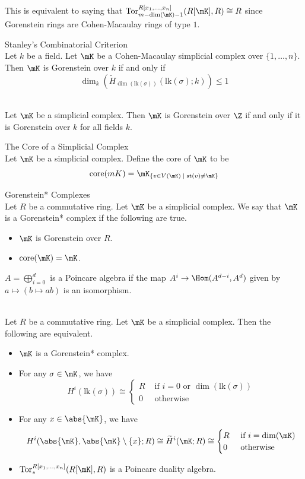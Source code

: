 \documentclass[a4paper]{article}
\begin{document}
This is equivalent to saying that $\text{Tor}_{m-\dim(\mK)-1}^{R[x_1,\dots,x_n]}(R[\mK],R)\cong R$ since Gorenstein rings are Cohen-Macaulay rings of type $1$. 

\begin{prp}{Stanley's Combinatorial Criterion}{}\\
Let $k$ be a field. Let $\mK$ be a Cohen-Macaulay simplicial complex over $\{1,\dots,n\}$. Then $\mK$ is Gorenstein over $k$ if and only if $$\dim_k(\widetilde{H}_{\dim(\text{lk}(\sigma))}(\text{lk}(\sigma);k))\leq 1$$
\end{prp}

\begin{prp}{}{}\\
Let $\mK$ be a simplicial complex. Then $\mK$ is Gorenstein over $\Z$ if and only if it is Gorenstein over $k$ for all fields $k$. 
\end{prp}

\begin{defn}{The Core of a Simplicial Complex}{}\\
Let $\mK$ be a simplicial complex. Define the core of $\mK$ to be $$\text{core}(mK)=\mK_{\{v\in V(\mK)\;|\;\text{st}(v)\neq\mK\}}$$
\end{defn}

\begin{defn}{Gorenstein* Complexes}{}\\
Let $R$ be a commutative ring. Let $\mK$ be a simplicial complex. We say that $\mK$ is a Gorenstein* complex if the following are true. 
\begin{itemize}
\item $\mK$ is Gorenstein over $R$. 
\item $\text{core}(\mK)=\mK$. 
\end{itemize}
\end{defn}

$A=\bigoplus_{i=0}^d$ is a Poincare algebra if the map $A^i\to\Hom(A^{d-i},A^d)$ given by $a\mapsto(b\mapsto ab)$ is an isomorphism. 

\begin{prp}{}{}\\
Let $R$ be a commutative ring. Let $\mK$ be a simplicial complex. Then the following are equivalent. 
\begin{itemize}
\item $\mK$ is a Gorenstein* complex. 
\item For any $\sigma\in\mK$, we have $$H^i(\text{lk}(\sigma))\cong\begin{cases}
R & \text{ if }i=0\text{ or }\dim(\text{lk}(\sigma))\\
0 & \text{ otherwise }
\end{cases}$$
\item For any $x\in\abs{\mK}$, we have $$H^i(\abs{\mK},\abs{\mK}\setminus\{x\};R)\cong\widetilde{H}^i(\mK;R)\cong\begin{cases}
R & \text{ if }i=\dim(\mK)\\
0 & \text{ otherwise }
\end{cases}$$
\item $\text{Tor}_\ast^{R[x_1,\dots,x_n]}(R[\mK],R)$ is a Poincare duality algebra. 
\end{itemize}
\end{prp}
\end{document}

